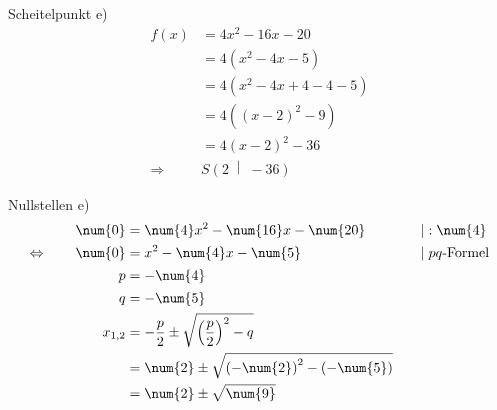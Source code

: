 \begin{exercise}
    \begin{minipage}[t]{0.49\linewidth}
      Scheitelpunkt e)
      \small
      \begin{equation*}
        \begin{split}
          f(x)&=4x^2-16x-20
          \\
          &=4\left(x^2-4x-5\right)
          \\
          &=4\left(x^2-4x+4-4-5\right)
          \\
          &=4\left((x-2)^2-9\right)
          \\
          &=4(x-2)^2-36
          \\[1ex]
          \Rightarrow\quad&S\left(2\;\middle|\;-36\right)
        \end{split}
      \end{equation*}
    \end{minipage}%
    \hfill
    \begin{minipage}[t]{0.49\linewidth}
      Nullstellen e)
      \small
      \begingroup
        \newcommand{\vstrut}{\vphantom{\left(f_0^0\right)}}%
        \newcommand{\noeq}{\phantom{\Leftrightarrow}\vstrut&\quad}%
        \newcommand{\iseq}{\Leftrightarrow\vstrut&\quad}%
        \newcommand{\impl}{\Rightarrow\vstrut&\quad}%
        \newcommand{\nomod}{\quad&\phantom{|}}%
        \newcommand{\domod}[1]{\quad&|#1}%
        \begin{alignat*}{3}
          \noeq
          &
          \num{0}&=\num{4}x^{2}-\num{16}x-\num{20}
          &
          \domod{:\num{4}}
          \\
          \iseq
          &
          \num{0}&=x^{2}-\num{4}x-\num{5}
          &
          \domod{\;\text{$pq$-Formel}}
          \\
          \noeq
          &
          p&=-\num{4}
          &
          \nomod
          \\
          \noeq
          &
          q&=-\num{5}
          &
          \nomod
          \\
          \noeq
          &
          x_{1,2}&=-\frac{p}{2}\pm\sqrt{\left(\frac{p}{2}\right)^2-q}
          &
          \nomod
          \\
          \noeq
          &
          &=\num{2}\pm\sqrt{\left(-\num{2}\right)^2-\left(-\num{5}\right)}
          &
          \nomod
          \\
          \noeq
          &
          &=\num{2}\pm\sqrt{\num{9}}
          &
          \nomod
          \\
          \noeq

\end{alignat*}
\end{minipage}
\end{exercise}
